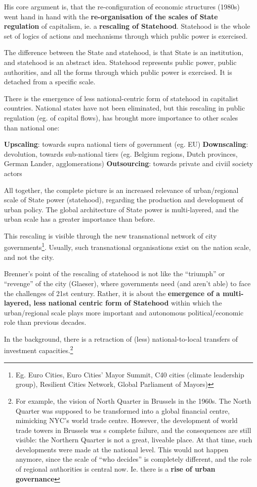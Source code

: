 \documentclass{article}
\begin{document}
His core argument is, that the re-configuration of economic structures (1980s) went hand in hand with the \textbf{re-organisation of the scales of State regulation} of capitalism, ie. a \textbf{rescaling of Statehood}. Statehood is the whole set of logics of actions and mechanisms through which public power is exercised. 

The difference between the State and statehood, is that State is an institution, and statehood is an abstract idea. Statehood represents public power, public authorities, and all the forms through which public power is exercised. It is detached from a specific scale.

There is the emergence of less national-centric form of statehood in capitalist countries. National states have not been eliminated, but this rescaling in public regulation (eg. of capital flows), has brought more importance to other scales than national one:

\begin{outline}
	\1 \textbf{Upscaling}: towards supra national tiers of government (eg. EU)
	\1 \textbf{Downscaling}: devolution, towards sub-national tiers (eg. Belgium regions, Dutch provinces, German Lander, agglomerations)
	\1 \textbf{Outsourcing}: towards private and civiil society actors
\end{outline}

All together, the complete picture is an increased relevance of urban/regional scale of State power (statehood), regarding the production and development of urban policy.
The global architecture of State power is multi-layered, and the urban scale has a greater importance than before.

This rescaling is visible through the new transnational network of city governments\footnote{Eg. Euro Cities, Euro Cities' Mayor Summit, C40 cities (climate leadership group), Resilient Cities Network, Global Parliament of Mayors)}. Usually, such transnational organisations exist on the nation scale, and not the city.

Brenner's point of the rescaling of statehood is not like the ``triumph'' or ``revenge'' of the city (Glaeser), where governments need (and aren't able) to face the challenges of 21st century.
Rather, it is about the \textbf{emergence of a multi-layered, less national centric form of Statehood} within which the urban/regional scale plays more important and autonomous political/economic role than previous decades.

In the background, there is a retraction of (less) national-to-local transfers of investment capacities.\footnote{For example, the vision of North Quarter in Brussels in the 1960s. The North Quarter was supposed to be transformed into a global financial centre, mimicking NYC's  world trade centre. However, the development of world trade towers in Brussels was s complete failure, and the consequences are still visible: the Northern Quarter is not a great, liveable place. At that time, such developments were made at the national level. This would not happen anymore, since the scale of ``who decides'' is completely different, and the role of regional authorities is central now. Ie. there is a \textbf{rise of urban governance}}
\end{document}
